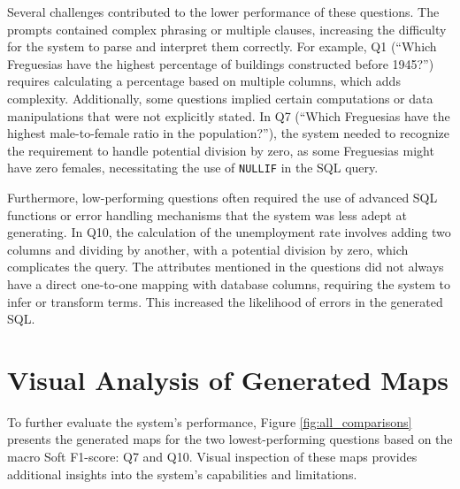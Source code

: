 Several challenges contributed to the lower performance of these questions. The prompts contained complex phrasing or multiple clauses, increasing the difficulty for the system to parse and interpret them correctly. For example, Q1 (“Which Freguesias have the highest percentage of buildings constructed before 1945?”) requires calculating a percentage based on multiple columns, which adds complexity. Additionally, some questions implied certain computations or data manipulations that were not explicitly stated. In Q7 (“Which Freguesias have the highest male-to-female ratio in the population?”), the system needed to recognize the requirement to handle potential division by zero, as some Freguesias might have zero females, necessitating the use of \texttt{NULLIF} in the SQL query.

Furthermore, low-performing questions often required the use of advanced SQL functions or error handling mechanisms that the system was less adept at generating. In Q10, the calculation of the unemployment rate involves adding two columns and dividing by another, with a potential division by zero, which complicates the query. The attributes mentioned in the questions did not always have a direct one-to-one mapping with database columns, requiring the system to infer or transform terms. This increased the likelihood of errors in the generated SQL.


\section{Visual Analysis of Generated Maps}

To further evaluate the system's performance, Figure \ref{fig:all_comparisons} presents the generated maps for the two lowest-performing questions based on the macro Soft F1-score: Q7 and Q10. Visual inspection of these maps provides additional insights into the system's capabilities and limitations.

